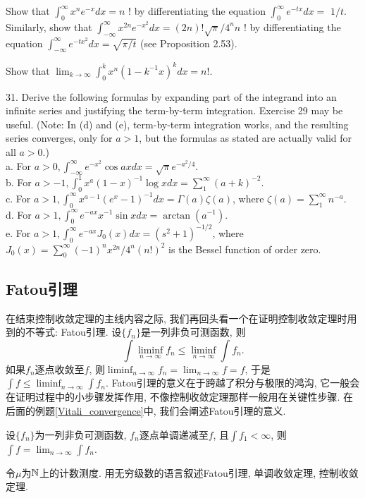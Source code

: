 \begin{exercise}
    Show that $\int_0^{\infty} x^n e^{-x} d x=n$ ! by differentiating the equation $\int_0^{\infty} e^{-t x} d x=$ $1 / t$. Similarly, show that $\int_{-\infty}^{\infty} x^{2 n} e^{-x^2} d x=(2 n) ! \sqrt{\pi} / 4^n n$ ! by differentiating the equation $\int_{-\infty}^{\infty} e^{-t x^2} d x=\sqrt{\pi / t}$ (see Proposition 2.53).
\end{exercise}

\begin{exercise}
    Show that $\lim _{k \rightarrow \infty} \int_0^k x^n\left(1-k^{-1} x\right)^k d x=n !$.
\end{exercise}

\begin{exercise}
    31. Derive the following formulas by expanding part of the integrand into an infinite series and justifying the term-by-term integration. Exercise 29 may be useful. (Note: In (d) and (e), term-by-term integration works, and the resulting series converges, only for $a>1$, but the formulas as stated are actually valid for all $a>0$.) \\
    a. For $a>0, \int_{-\infty}^{\infty} e^{-x^2} \cos a x d x=\sqrt{\pi} e^{-a^2 / 4}$. \\
    b. For $a>-1, \int_0^1 x^a(1-x)^{-1} \log x d x=\sum_1^{\infty}(a+k)^{-2}$. \\
    c. For $a>1, \int_0^{\infty} x^{a-1}\left(e^x-1\right)^{-1} d x=\Gamma(a) \zeta(a)$, where $\zeta(a)=\sum_1^{\infty} n^{-a}$. \\
    d. For $a>1, \int_0^{\infty} e^{-a x} x^{-1} \sin x d x=\arctan \left(a^{-1}\right)$. \\
    e. For $a>1, \int_0^{\infty} e^{-a x} J_0(x) d x=\left(s^2+1\right)^{-1 / 2}$, where $J_0(x)=\sum_0^{\infty}(-1)^n x^{2 n} / 4^n(n !)^2$ is the Bessel function of order zero. 
\end{exercise}

\subsection{Fatou引理}
在结束控制收敛定理的主线内容之际, 我们再回头看一个在证明控制收敛定理时用到的不等式: Fatou引理.
设$\{f_n\}$是一列非负可测函数, 则
$$\int \liminf_{n \to \infty} f_n \leq \liminf_{n \to \infty} \int f_n. $$
如果$f_n$逐点收敛至$f$, 则$\liminf_{n \to \infty}f_n = \lim_{n \to \infty}f = f$, 于是$\int f \leq \liminf_{n \to \infty} \int f_n$. 
Fatou引理的意义在于跨越了积分与极限的鸿沟, 它一般会在证明过程中的小步骤发挥作用, 不像控制收敛定理那样一般用在关键性步骤. 在后面的例题\ref{Vitali_convergence}中, 我们会阐述Fatou引理的意义. 
\begin{exercise}
    设$\{f_n\}$为一列非负可测函数, $f_n$逐点单调递减至$f$, 且$\int f_1 < \infty$, 则$\int f = \lim_{n\to \infty} \int f_n$. 
\end{exercise}

\begin{example}
    令$\mu$为$\mathbb{N}$上的计数测度. 用无穷级数的语言叙述Fatou引理, 单调收敛定理, 控制收敛定理. 
\end{example}